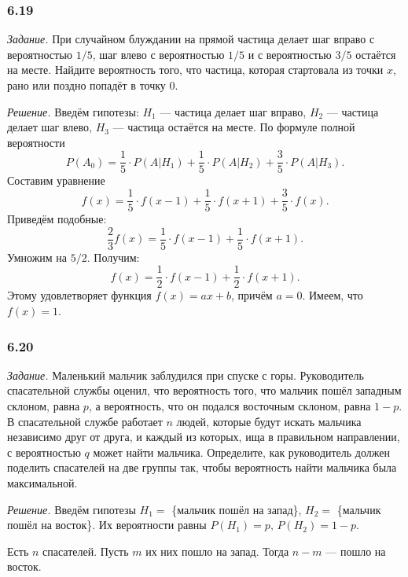 \subsubsection*{6.19}

\textit{Задание.}
При случайном блуждании на прямой частица делает шаг вправо с вероятностью $1/5$,
шаг влево с вероятностью $1/5$ и с вероятностью $3/5$ остаётся на месте.
Найдите вероятность того, что частица, которая стартовала из точки $x$, рано или поздно попадёт в точку 0.

\textit{Решение.} Введём гипотезы: $H_1$ --- частица делает шаг вправо, $H_2$ --- частица делает шаг влево, $H_3$ --- частица остаётся на месте.
По формуле полной вероятности
$$P \left( A_0 \right) =
\frac{1}{5} \cdot P \left( \left. A \right| H_1 \right) +
\frac{1}{5} \cdot P \left( \left. A \right| H_2 \right) + \frac{3}{5} \cdot P \left( \left. A \right| H_3 \right).$$
Составим уравнение
$$f \left( x \right) =
\frac{1}{5} \cdot f \left( x-1 \right) + \frac{1}{5} \cdot f \left( x+1 \right) + \frac{3}{5} \cdot f \left( x \right).$$
Приведём подобные:
$$ \frac{2}{3} f \left( x \right) =
\frac{1}{5} \cdot f \left( x-1 \right) + \frac{1}{5} \cdot f \left( x+1 \right).$$
Умножим на $5/2$.
Получим:
$$f \left( x \right) =
\frac{1}{2} \cdot f \left( x-1 \right) + \frac{1}{2} \cdot f \left( x+1 \right).$$
Этому удовлетворяет функция $f \left( x \right) = ax + b$, причём $a = 0$.
Имеем, что $f \left( x \right) =1$.

\subsubsection*{6.20}

\textit{Задание.} Маленький мальчик заблудился при спуске с горы.
Руководитель спасательной службы оценил, что вероятность того,
что мальчик пошёл западным склоном, равна $p$, а вероятность, что он подался восточным склоном, равна $1 - p$.
В спасательной службе работает $n$ людей, которые будут искать мальчика независимо друг от друга,
и каждый из которых, ища в правильном направлении, с вероятностью $q$ может найти мальчика.
Определите, как руководитель должен поделить спасателей на две группы так, чтобы вероятность найти мальчика была максимальной.

\textit{Решение.} Введём гипотезы $H_1 =$ \{мальчик пошёл на запад\}, $H_2 =$ \{мальчик пошёл на восток\}.
Их вероятности равны $P \left( H_1 \right) = p, \, P \left( H_2 \right) = 1 - p$.

Есть $n$ спасателей.
Пусть $m$ их них пошло на запад.
Тогда $n - m$ --- пошло на восток.

